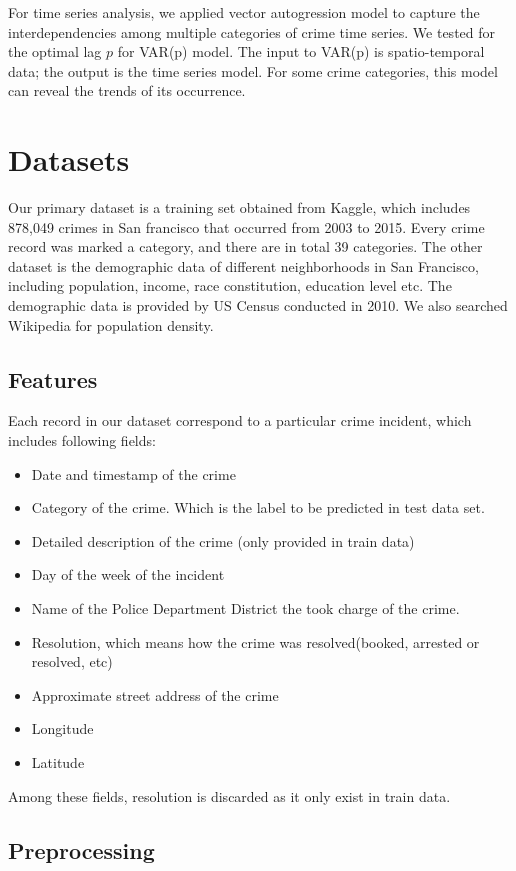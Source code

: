 \documentclass[11pt,conference]{IEEEtran}
\begin{document}
For time series analysis, we  applied vector autogression model to capture the interdependencies among multiple categories of crime time series. We tested for the optimal lag $p$ for VAR(p) model. The input to VAR(p) is spatio-temporal data; the output is the time series model. For some crime categories, this model can reveal the trends of its occurrence.

\section{Datasets}
Our primary dataset is a training set obtained from Kaggle, which includes 878,049 crimes in San francisco that occurred from 2003 to 2015. Every crime record was marked a category, and there are in total 39 categories. The other dataset is the demographic data of different neighborhoods in San Francisco, including population, income, race constitution, education level etc. The demographic data is provided by US Census conducted in 2010. We also searched Wikipedia for population density. 
\subsection{Features}
Each record in our dataset correspond to a particular crime incident, which includes following fields:
\begin{itemize}
  \item Date and timestamp of the crime
  \item Category of the crime. Which is the label to be predicted in test data set.
  \item Detailed description of the crime (only provided in train data)
  \item Day of the week of the incident
  \item Name of the Police Department District the took charge of the crime.
  \item Resolution, which means how the crime was resolved(booked, arrested or resolved, etc)
  \item Approximate street address of the crime
  \item Longitude
  \item Latitude
\end{itemize}
Among these fields, resolution is discarded as it only exist in train data.
\subsection{Preprocessing}
\end{document}

